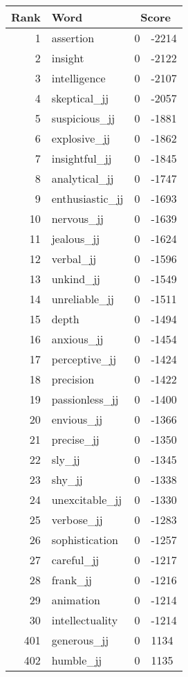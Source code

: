 \begin{longtable}[!htbp]{| rlr@{.}l |}
    \hline
    \textbf{Rank} & \textbf{Word} & \multicolumn{2}{c|}{\textbf{Score}} \\
    \hline
    \endhead
    1 & assertion & 0 & -2214 \\
    2 & insight & 0 & -2122 \\
    3 & intelligence & 0 & -2107 \\
    4 & skeptical\_jj & 0 & -2057 \\
    5 & suspicious\_jj & 0 & -1881 \\
    6 & explosive\_jj & 0 & -1862 \\
    7 & insightful\_jj & 0 & -1845 \\
    8 & analytical\_jj & 0 & -1747 \\
    9 & enthusiastic\_jj & 0 & -1693 \\
    10 & nervous\_jj & 0 & -1639 \\
    11 & jealous\_jj & 0 & -1624 \\
    12 & verbal\_jj & 0 & -1596 \\
    13 & unkind\_jj & 0 & -1549 \\
    14 & unreliable\_jj & 0 & -1511 \\
    15 & depth & 0 & -1494 \\
    16 & anxious\_jj & 0 & -1454 \\
    17 & perceptive\_jj & 0 & -1424 \\
    18 & precision & 0 & -1422 \\
    19 & passionless\_jj & 0 & -1400 \\
    20 & envious\_jj & 0 & -1366 \\
    21 & precise\_jj & 0 & -1350 \\
    22 & sly\_jj & 0 & -1345 \\
    23 & shy\_jj & 0 & -1338 \\
    24 & unexcitable\_jj & 0 & -1330 \\
    25 & verbose\_jj & 0 & -1283 \\
    26 & sophistication & 0 & -1257 \\
    27 & careful\_jj & 0 & -1217 \\
    28 & frank\_jj & 0 & -1216 \\
    29 & animation & 0 & -1214 \\
    30 & intellectuality & 0 & -1214 \\
    401 & generous\_jj & 0 & 1134 \\
    402 & humble\_jj & 0 & 1135 \\

\end{longtable}
